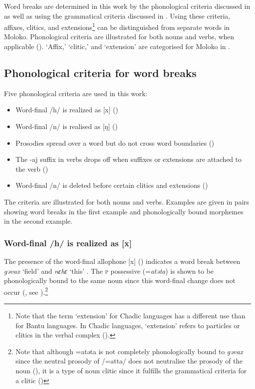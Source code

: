 \largerpage Word breaks are determined in this work by the phonological criteria discussed in  as well as using the grammatical criteria discussed in . Using these criteria, affixes, clitics, and extensions\footnote{Note that the term ‘extension’ for Chadic languages has a different use than for Bantu languages. In Chadic languages, ‘extension’ refers to particles or clitics in the verbal complex ().} can be distinguished from separate words in Moloko. Phonological criteria are illustrated for both nouns and verbs, when applicable (). ‘Affix,’ ‘clitic,’ and ‘extension’ are categorised for Moloko in .

\subsection{Phonological criteria for word breaks}\label{sec:2.6.1}
\hypertarget{RefHeading1210761525720847}{}
Five phonological criteria are used in this work:
\begin{itemize}
 \item Word-final /h/ is realized as [x] ()
 \item Word-final /n/ is realised as [ŋ] ()
 \item Prosodies spread over a word but do not cross word boundaries ()
 \item The -aj suffix in verbs drops off when suffixes or extensions are attached to the verb ()
 \item Word-final /n/ is deleted before certain clitics and extensions ()
\end{itemize}
The criteria are illustrated for both nouns and verbs. Examples are given in pairs showing word breaks in the first example and phonologically bound morphemes in the second example. 

\subsubsection{Word-final /h/ is realized as [x]}\label{sec:2.6.1.1}

 The presence of the word-final allophone [x] (\citealt{Bow1997c}) indicates a word break between \textit{gəvax} ‘field' and \textit{nɛhɛ} ‘this' . The \textsc{p} possessive (=\textit{atəta}) is shown to be phonologically bound to the same noun  since this word-final change does not occur (\citealt{Bow1997c}, see ).\footnote{Note that although =atəta is not completely phonologically bound to \textit{gəvax} since the neutral prosody of /=atta/ does not neutralise the prosody of the noun (), it is a type of noun clitic since it fulfills the grammatical criteria for a clitic ()} 

